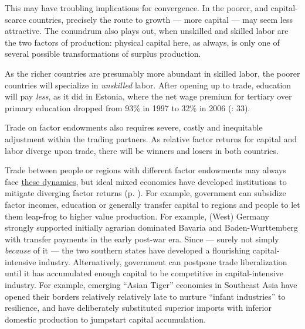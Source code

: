 \documentclass[11pt,a4paper,oneside,openright]{article}
\begin{document}
This may have troubling implications for convergence. 
In the poorer, and capital-scarce countries, precisely the route to growth --- more capital --- may seem less attractive. 
The conundrum also plays out, when unskilled and skilled labor are the two factors of production: 
physical capital here, as always, is only one of several possible transformations of surplus production. 

As the richer countries are presumably more abundant in skilled labor, the poorer countries will specialize in \emph{unskilled} labor. 
After opening up to trade, education will pay \emph{less}, as it did in Estonia, where the net wage premium for tertiary over primary education dropped from 93\% in 1997 to 32\% in 2006 (\citealt{Piatkowski2008}: 33).


Trade on factor endowments also requires severe, costly and inequitable adjustment within the trading partners. 
As relative factor returns for capital and labor diverge upon trade, there will be winners and losers in both countries. 

Trade between people or regions with different factor endowments may always face \hyperref[sec:space]{these dynamics}, but ideal mixed economies have developed institutions to mitigate diverging factor returns (p. \pageref{sec:space}). 
For example, government can subsidize factor incomes, education or generally transfer capital to regions and people to let them leap-frog to higher value production. 
For example, (West) Germany strongly supported initially agrarian dominated Bavaria and Baden-Wurttemberg with transfer payments in the early post-war era. 
Since --- surely not simply \emph{because} of it --- the two southern states have developed a flourishing capital-intensive industry. 
Alternatively, government can postpone trade liberalization until it has accumulated enough capital to be competitive in capital-intensive industry. 
For example, emerging ``Asian Tiger'' economies in Southeast Asia have opened their borders relatively relatively late to nurture ``infant industries'' to resilience, and have deliberately substituted superior imports with inferior domestic production to jumpstart capital accumulation.
\end{document}
